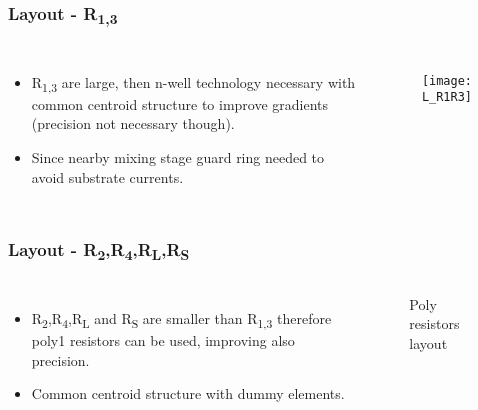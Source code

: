 \begin{frame}
\frametitle{Layout - R\textsubscript{1,3}}
\begin{columns}
	\begin{itemize}
	\item R\textsubscript{1,3} are large, then n-well technology necessary with common centroid structure to improve gradients (precision not necessary though). 
	\item Since nearby mixing stage guard ring needed to avoid substrate currents.
	\end{itemize}
	\begin{figure}[H]
		\centering
		\texttt{[image: L\_R1R3]}
		\label{L_R1R3}
	\end{figure}
\end{columns}
\end{frame}

\begin{frame}
\frametitle{Layout - R\textsubscript{2},R\textsubscript{4},R\textsubscript{L},R\textsubscript{S}}
\begin{columns}
	\begin{itemize}	
	\item R\textsubscript{2},R\textsubscript{4},R\textsubscript{L} and R\textsubscript{S} are smaller than R\textsubscript{1,3} therefore poly1 resistors can be used, improving also precision. 
	\item Common centroid structure with dummy elements.
	\end{itemize}
	\begin{figure}[H]
		\centering
		
		\vfill
		\hfil
		\caption{Poly resistors layout}
	\end{figure}
\end{columns}
\end{frame}

